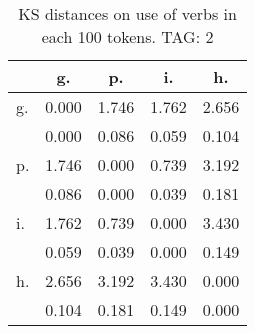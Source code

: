 \begin{table}[h!]
\begin{center}
\begin{tabular}{| l | c | c | c | c |}\hline
 & g. & p. & i. & h. \\\hline
g. & 0.000  & 1.746  & 1.762  & 2.656 \\\hline
 & 0.000  & 0.086  & 0.059  & 0.104 \\\hline
p. & 1.746  & 0.000  & 0.739  & 3.192 \\\hline
 & 0.086  & 0.000  & 0.039  & 0.181 \\\hline
i. & 1.762  & 0.739  & 0.000  & 3.430 \\\hline
 & 0.059  & 0.039  & 0.000  & 0.149 \\\hline
h. & 2.656  & 3.192  & 3.430  & 0.000 \\\hline
 & 0.104  & 0.181  & 0.149  & 0.000 \\\hline
\end{tabular}
\caption{KS distances on use of verbs in each 100 tokens. TAG: 2}
\end{center}
\end{table}